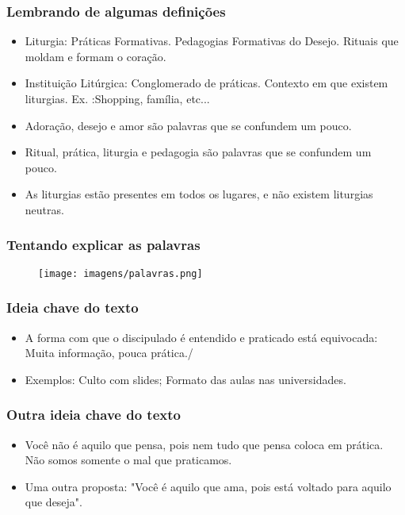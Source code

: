 \begin{frame}
	\frametitle{Lembrando de algumas definições}

	\begin{itemize}
		\item <1>Liturgia: Práticas Formativas. Pedagogias Formativas do Desejo. Rituais que moldam e formam o coração\footnotemark.
		\item <2>Instituição Litúrgica: Conglomerado de práticas. Contexto em que existem liturgias. Ex. :Shopping, família, etc...
		\item <3>Adoração, desejo e amor são palavras que se confundem um pouco.
		\item <4>Ritual, prática, liturgia e pedagogia são palavras que se confundem um pouco.
		\item <5>As liturgias estão presentes em todos os lugares, e não existem liturgias neutras.
	\end{itemize}
\end{frame}

\begin{frame}
	\frametitle{Tentando explicar as palavras}
    \begin{figure}[h]
        \texttt{[image: imagens/palavras.png]}
    \end{figure}
\end{frame}

\begin{frame}
	\frametitle{Ideia chave do texto}

	\begin{itemize}
		\item <1>A forma com que o discipulado é entendido e praticado está equivocada: Muita informação, pouca prática\footnotemark./
		\item <2>Exemplos: Culto com slides; Formato das aulas nas universidades.
	\end{itemize}

\end{frame}

\begin{frame}
	\frametitle{Outra ideia chave do texto}

	\begin{itemize}
		\item <1>Você não é aquilo que pensa, pois nem tudo que pensa coloca em prática. Não somos somente o mal que praticamos\footnotemark.
		\item <2>Uma outra proposta: "Você é aquilo que ama, pois está voltado para aquilo que deseja"\footnotemark.
	\end{itemize}

\end{frame}

